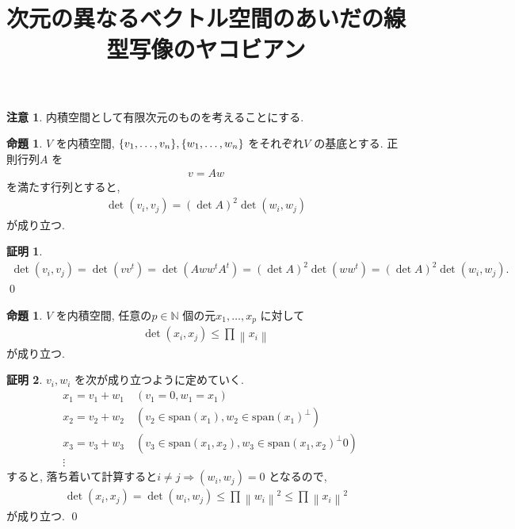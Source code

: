 \documentclass[10pt, fleqn, label-section=none]{bxjsarticle}
\title{次元の異なるベクトル空間のあいだの線型写像のヤコビアン}
\date{}
\author{}
\theoremstyle{definition}
\newtheorem{prop}[dfn]{命題}
\newtheorem*{pf*}{証明}
\newtheorem{remark}[dfn]{注意}
\newcommand{\cbra}[1]{\mleft\{#1\mright\}}
\newcommand{\norm}[1]{\left\|#1\right\|}
\newcommand{\naraba}{\Rightarrow}
\renewcommand{\;}{\, ; \,}
\begin{document}
\maketitle

\section{}

\begin{remark}
内積空間として有限次元のものを考えることにする. 
\end{remark}

\begin{prop}$V$ を内積空間, $\cbra{v_1, \ldots, v_n}, \cbra{w_1, \ldots, w_n} $ をそれぞれ$V$ の基底とする. 正則行列$A$ を
\begin{align*} v = A w\end{align*}
を満たす行列とすると, 
\begin{align*} \det(v_i, v_j) = (\det A)^2 \det (w_i, w_j) \end{align*}
が成り立つ. 
\end{prop}
\begin{pf*}
\begin{align*} \det(v_i, v_j) = \det(v v^t) = \det (Aww^t A^t) = (\det A)^2 \det (w w^t) = (\det A)^2 \det (w_i, w_j) .\end{align*}
\qed
\end{pf*}

\begin{prop}$V$ を内積空間, 任意の$p \in \mathbb N$ 個の元$x_1, \ldots , x_p$ に対して
\begin{align*} \det(x_i, x_j) \leq \prod \norm{x_i} \end{align*}
が成り立つ. 
\end{prop}
\begin{pf*}$v_i, w_i$ を次が成り立つように定めていく. 
\begin{align*} &x_1 = v_1 +  w_1 \quad (v_1 = 0, w_1 = x_1) \\ &x_2 = v_2 + w_2 \quad (v_2 \in \textrm{span}(x_1), w_2 \in \textrm{span}(x_1) ^\perp )\\ &
x_3 = v_3 + w_3 \quad (v_3 \in \textrm{span}(x_1, x_2), w_3 \in \textrm{span}(x_1, x_2) ^\perp0 ) \\& \vdots  
 \end{align*}
 すると, 落ち着いて計算すると$i\neq j \naraba (w_i, w_j) = 0 $ となるので, 
 \begin{align*} \det(x_i, x_j) = \det(w_i, w_j) \leq \prod \norm{w_i}^2 \leq \prod \norm{x_i}^2   \end{align*}
 が成り立つ. 
\qed
\end{pf*}
\end{document}
